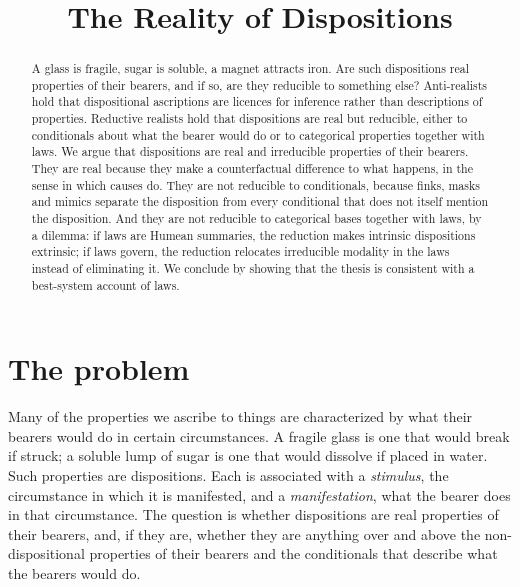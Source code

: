 \documentclass{situationist-preprint}
\title{The Reality of Dispositions}
\begin{document}
\maketitle

\begin{abstract}
A glass is fragile, sugar is soluble, a magnet attracts iron. Are such dispositions real properties of their bearers, and if so, are they reducible to something else? Anti-realists hold that dispositional ascriptions are licences for inference rather than descriptions of properties. Reductive realists hold that dispositions are real but reducible, either to conditionals about what the bearer would do or to categorical properties together with laws. We argue that dispositions are real and irreducible properties of their bearers. They are real because they make a counterfactual difference to what happens, in the sense in which causes do. They are not reducible to conditionals, because finks, masks and mimics separate the disposition from every conditional that does not itself mention the disposition. And they are not reducible to categorical bases together with laws, by a dilemma: if laws are Humean summaries, the reduction makes intrinsic dispositions extrinsic; if laws govern, the reduction relocates irreducible modality in the laws instead of eliminating it. We conclude by showing that the thesis is consistent with a best-system account of laws.
\end{abstract}

\section{The problem}\label{s:problem}

Many of the properties we ascribe to things are characterized by what their bearers would do in certain circumstances. A fragile glass is one that would break if struck; a soluble lump of sugar is one that would dissolve if placed in water. Such properties are dispositions. Each is associated with a \emph{stimulus}, the circumstance in which it is manifested, and a \emph{manifestation}, what the bearer does in that circumstance. The question is whether dispositions are real properties of their bearers, and, if they are, whether they are anything over and above the non-dispositional properties of their bearers and the conditionals that describe what the bearers would do.
\end{document}
